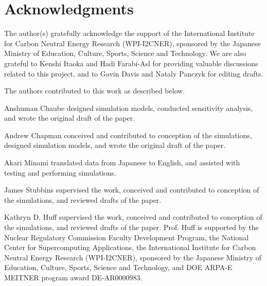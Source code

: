 \section{Acknowledgments}

The author(s) gratefully acknowledge the support of the International Institute for Carbon Neutral Energy Research (WPI-I2CNER), sponsored by the Japanese Ministry of Education, Culture, Sports, Science and Technology. We are also grateful to Kenshi Itaoka and Hadi Farabi-Asl for providing valuable discussions related to this project, and to Gavin Davis and Nataly Panczyk for editing drafts.

The authors contributed to this work as described below.

Anshuman Chaube designed simulation models, conducted sensitivity analysis, and wrote the original draft of the paper.

Andrew Chapman conceived and contributed to conception of the simulations, designed simulation models, and wrote the original draft of the paper. 

Akari Minami translated data from Japanese to English, and assisted with testing and performing simulations.

James Stubbins supervised the work, conceived and contributed to conception of the simulations, and reviewed drafts of the paper.

Kathryn D. Huff supervised the work, conceived and contributed to conception of the simulations, and reviewed drafts of the paper.  Prof. Huff is supported by the Nuclear Regulatory Commission Faculty Development Program, the National Center for Supercomputing Applications, the International Institute for Carbon Neutral Energy Research (WPI-I2CNER), sponsored by the Japanese Ministry of Education, Culture, Sports, Science and Technology, and  DOE ARPA-E MEITNER program award DE-AR0000983.
